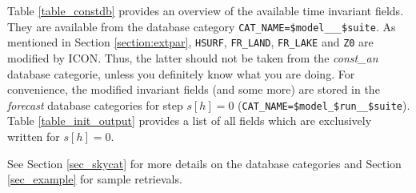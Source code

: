 Table \ref{table_constdb} provides an overview of the available time invariant fields. They are available from the database category 
\texttt{CAT\_NAME=\$model\_\_\_\$suite}. As mentioned in Section \ref{section:extpar}, \texttt{HSURF}, 
\texttt{FR\_LAND}, \texttt{FR\_LAKE} and \texttt{Z0} are modified by ICON. Thus, the latter should not be taken from the \emph{const\_an} 
database categorie, unless you definitely know what you are doing. For convenience, the modified invariant fields (and some more) 
are stored in the \emph{forecast} database categories for step $s[h]=0$ (\texttt{CAT\_NAME=\$model\_\$run\_\_\$suite}). Table 
\ref{table_init_output} provides a list of all fields which are exclusively written for $s[h]=0$.

See Section \ref{sec_skycat} for more details on the database categories and Section \ref{sec_example} for sample retrievals.
 



